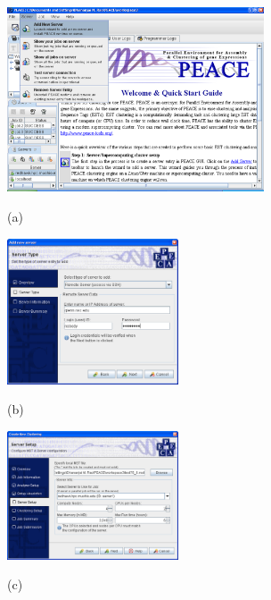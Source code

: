 \documentclass[a4,center,fleqn]{NAR}
\begin{document}
\begin{figure}
  \begin{minipage}{3in}
    \includegraphics[width=3in]{screen.d/install_page_big.png}
    \centerline{\small{(a)}}
  \end{minipage}
  \begin{minipage}{2in}
    \vspace{0.47in}
    \includegraphics[width=2in]{screen.d/add_server_big.png}
    \centerline{\small{(b)}}
  \end{minipage}
  \begin{minipage}{2in}
    \vspace{0.47in}
    \includegraphics[width=2in]{screen.d/processor_assignment_big.png}
    \centerline{\small{(c)}}
  \end{minipage}


\end{figure}
\end{document}
